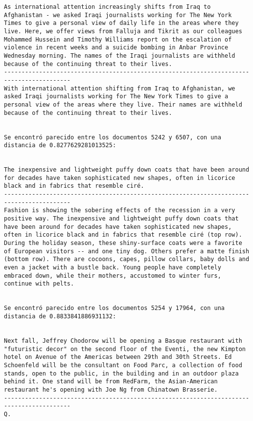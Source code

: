 \documentclass[11pt]{article}
\begin{document}
\begin{Verbatim}[commandchars=\\\{\}]
As international attention increasingly shifts from Iraq to Afghanistan - we asked Iraqi journalists working for The New York Times to give a personal view of daily life in the areas where they live. Here, we offer views from Falluja and Tikrit as our colleagues Mohammed Hussein and Timothy Williams report on the escalation of violence in recent weeks and a suicide bombing in Anbar Province Wednesday morning. The names of the Iraqi journalists are withheld because of the continuing threat to their lives.
-----------------------------------------------------------------------------------------
With international attention shifting from Iraq to Afghanistan, we asked Iraqi journalists working for The New York Times to give a personal view of the areas where they live. Their names are withheld because of the continuing threat to their lives.


Se encontró parecido entre los documentos 5242 y 6507, con una distancia de 0.8277629281013525:


The inexpensive and lightweight puffy down coats that have been around for decades have taken sophisticated new shapes, often in licorice black and in fabrics that resemble ciré.
-----------------------------------------------------------------------------------------
Fashion is showing the sobering effects of the recession in a very positive way. The inexpensive and lightweight puffy down coats that have been around for decades have taken sophisticated new shapes, often in licorice black and in fabrics that resemble ciré (top row). During the holiday season, these shiny-surface coats were a favorite of European visitors -- and one tiny dog. Others prefer a matte finish (bottom row). There are cocoons, capes, pillow collars, baby dolls and even a jacket with a bustle back. Young people have completely embraced down, while their mothers, accustomed to winter furs, continue with pelts.


Se encontró parecido entre los documentos 5254 y 17964, con una distancia de 0.8833841886931132:


Next fall, Jeffrey Chodorow will be opening a Basque restaurant with "futuristic decor" on the second floor of the Eventi, the new Kimpton hotel on Avenue of the Americas between 29th and 30th Streets. Ed Schoenfeld will be the consultant on Food Parc, a collection of food stands, open to the public, in the building and in an outdoor plaza behind it. One stand will be from RedFarm, the Asian-American restaurant he's opening with Joe Ng from Chinatown Brasserie.
-----------------------------------------------------------------------------------------
Q.



\end{Verbatim}
\end{document}
